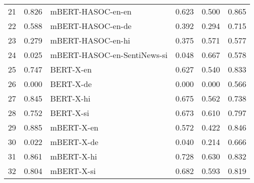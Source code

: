 \begin{tabular}{lrlrrr}
21 &   0.826 &            mBERT-HASOC-en-en & 0.623 &      0.500 &    0.865 \\
22 &   0.588 &            mBERT-HASOC-en-de & 0.392 &      0.294 &    0.715 \\
23 &   0.279 &            mBERT-HASOC-en-hi & 0.375 &      0.571 &    0.577 \\
24 &   0.025 &  mBERT-HASOC-en-SentiNews-si & 0.048 &      0.667 &    0.578 \\
25 &   0.747 &                    BERT-X-en & 0.627 &      0.540 &    0.833 \\
26 &   0.000 &                    BERT-X-de & 0.000 &      0.000 &    0.566 \\
27 &   0.845 &                    BERT-X-hi & 0.675 &      0.562 &    0.738 \\
28 &   0.752 &                    BERT-X-si & 0.673 &      0.610 &    0.797 \\
29 &   0.885 &                   mBERT-X-en & 0.572 &      0.422 &    0.846 \\
30 &   0.022 &                   mBERT-X-de & 0.040 &      0.214 &    0.666 \\
31 &   0.861 &                   mBERT-X-hi & 0.728 &      0.630 &    0.832 \\
32 &   0.804 &                   mBERT-X-si & 0.682 &      0.593 &    0.819 \\
\bottomrule
\end{tabular}
